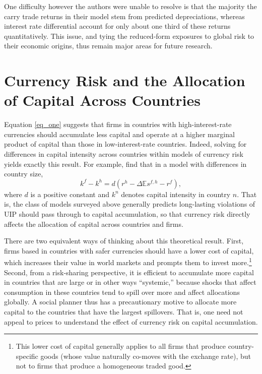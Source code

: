 \documentclass{ar-1col}
\begin{document}
One difficulty however the authors were unable to resolve is that the majority the carry trade returns in their model stem from predicted depreciations, whereas interest rate differential account for only about one third of these returns quantitatively. This issue, and tying the reduced-form exposures to global risk to their economic origins, thus remain major areas for future research.


\section{Currency Risk and the Allocation of Capital Across Countries\label{sec_capital}}

Equation \ref{eq_one} suggests that firms in countries with high-interest-rate currencies should accumulate less capital and operate at a higher marginal product of capital than those in low-interest-rate countries. Indeed, solving for differences in capital intensity across countries within models of currency risk yields exactly this result. For example, \citet{HassanMertensZhang2015} find that in a model with differences in country size,  
\begin{equation}
    k^f - k^h = d
    \left(r^h - \Delta \mathbb{E} s^{f, h} - r^f \right),
\end{equation}
where $d$ is a positive constant and $k^n$ denotes capital intensity in country $n$. That is, the class of models surveyed above generally predicts long-lasting violations of UIP should pass through to capital accumulation, so that currency risk directly affects the allocation of capital across countries and firms.

There are two equivalent ways of thinking about this theoretical result. First, firms based in countries with safer currencies should have a lower cost of capital, which increases their value in world markets and prompts them to invest more.\footnote{This lower cost of capital generally applies to all firms that produce country-specific goods (whose value naturally co-moves with the exchange rate), but not to firms that produce a homogeneous traded good.} Second, from a risk-sharing perspective, it is efficient to accumulate more capital in countries that are large or in other ways ``systemic,'' because shocks that affect consumption in these countries tend to spill over more and affect allocations globally. A social planner thus has a precautionary motive to allocate more capital to the countries that have the largest spillovers. That is, one need not appeal to prices to understand the effect of currency risk on capital accumulation.
\end{document}

